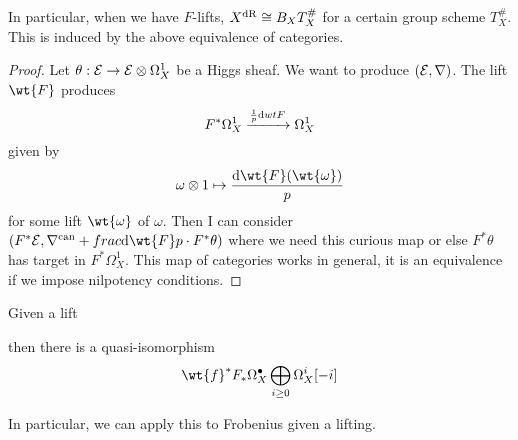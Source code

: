 \documentclass[12pt]{article}
\newcommand{\can}{\mathrm{can}}
\begin{document}
In particular, when we have $F$-lifts, $X^{\mathrm{dR}} \cong B_X T_X^{\#}$ for a certain group scheme $T_X^{\#}$. This is induced by the above equivalence of categories.

\begin{proof}
Let $\theta : \mathcal{E} \to \mathcal{E} \otimes \Omega_X^1$ be a Higgs sheaf. We want to produce $(\mathcal{E}, \nabla)$. The lift $\wt{F}$ produces
\[ F^* \Omega^1_X \xrightarrow{\frac{1}{p} \mathrm{d}{wt{F}}} \Omega_X^1 \]
given by
\[ \omega \ot 1 \mapsto \frac{\d{\wt{F}(\wt{\omega})}}{p} \]
for some lift $\wt{\omega}$ of $\omega$. 
Then I can consider $(F^* \E, \nabla^{\can} + \\frac{\d{\wt{F}}}{p} \cdot F^* \theta)$
where we need this curious map or else $F^* \theta$ has target in $F^* \Omega_X^1$. This map of categories works in general, it is an equivalence if we impose nilpotency conditions.
\end{proof}

\begin{cor}
Given a lift 
\begin{center}
\end{center}
then there is a quasi-isomorphism
\[ \wt{f}^* F_* \Omega_X^\bullet \bigoplus_{i \ge 0} \Omega_X^i[-i] \]
\end{cor}

In particular, we can apply this to Frobenius given a lifting. 
\end{document}
